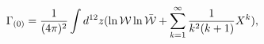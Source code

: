 \begin{equation}\label{g0}
\Gamma_{(0)}={1\over (4\pi)^{2}}\int d^{12}z (\ln {\cal W}\ln
\bar{\cal W}+ \sum_{k=1}^{\infty}{1\over k^{2}(k+1)} X^{k}),
\end{equation}

